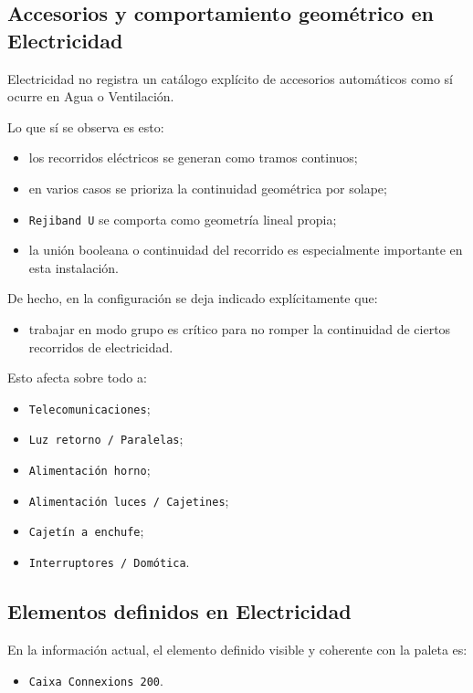 \subsection{Accesorios y comportamiento geométrico en Electricidad}

Electricidad no registra un catálogo explícito de accesorios automáticos como sí ocurre en Agua o Ventilación.

Lo que sí se observa es esto:

\begin{itemize}
\item los recorridos eléctricos se generan como tramos continuos;
\item en varios casos se prioriza la continuidad geométrica por solape;
\item \texttt{Rejiband U} se comporta como geometría lineal propia;
\item la unión booleana o continuidad del recorrido es especialmente importante en esta instalación.
\end{itemize}

De hecho, en la configuración se deja indicado explícitamente que:

\begin{itemize}
\item trabajar en modo grupo es crítico para no romper la continuidad de ciertos recorridos de electricidad.
\end{itemize}

Esto afecta sobre todo a:

\begin{itemize}
\item \texttt{Telecomunicaciones};
\item \texttt{Luz retorno / Paralelas};
\item \texttt{Alimentación horno};
\item \texttt{Alimentación luces / Cajetines};
\item \texttt{Cajetín a enchufe};
\item \texttt{Interruptores / Domótica}.
\end{itemize}

\subsection{Elementos definidos en Electricidad}

En la información actual, el elemento definido visible y coherente con la paleta es:

\begin{itemize}
\item \texttt{Caixa Connexions 200}.
\end{itemize}

